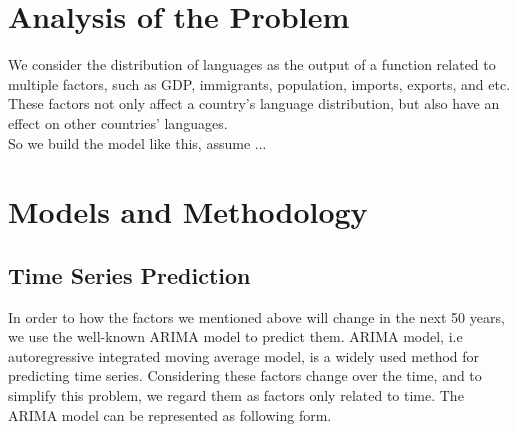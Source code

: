 \documentclass{mcmthesis}
\begin{document}





\section{Analysis of the Problem}
  \indent \indent We consider the distribution of languages as the output of a function related to multiple factors, such as GDP, immigrants, population, imports, exports, and etc. These factors not only affect a country's language distribution, but also have an effect on other countries' languages. \\
  \indent So we build the model like this, assume ...

\section{Models and Methodology}
  \subsection{Time Series Prediction}
  \indent \indent In order to how the factors we mentioned above will change in the next 50 years, we use the well-known ARIMA model to predict them. ARIMA model, i.e autoregressive integrated moving average model, is a widely used method for predicting time series. Considering these factors change over the time, and to simplify this problem, we regard them as factors only related to time. The ARIMA model can be represented as following form.
\end{document}
